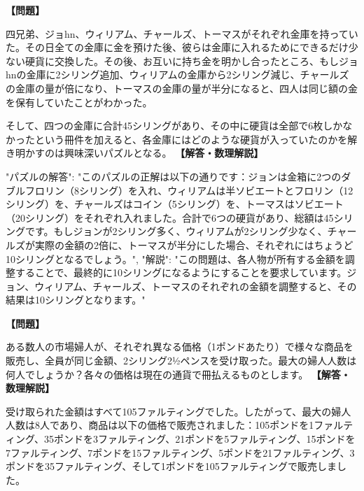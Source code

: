 \documentclass[10pt,a4paper,oneside,openany]{ltjsbook}
\begin{document}
\begin{tcolorbox}[colback=softblue,colframe=primaryblue,title=\textbf{第 17 問：THE PUZZLING MONEY-BOXES.},arc=2mm,boxrule=1pt,breakable]
\textbf{【問題】}\par\vspace{0.3em}
四兄弟、ジョhn、ウィリアム、チャールズ、トーマスがそれぞれ金庫を持っていた。その日全ての金庫に金を預けた後、彼らは金庫に入れるためにできるだけ少ない硬貨に交換した。その後、お互いに持ち金を明かし合ったところ、もしジョhnの金庫に2シリング追加、ウィリアムの金庫から2シリング減じ、チャールズの金庫の量が倍になり、トーマスの金庫の量が半分になると、四人は同じ額の金を保有していたことがわかった。

そして、四つの金庫に合計45シリングがあり、その中に硬貨は全部で6枚しかなかったという冊件を加えると、各金庫にはどのような硬貨が入っていたのかを解き明かすのは興味深いパズルとなる。
\tcblower
\textbf{【解答・数理解説】}\par\vspace{0.3em}
{
"パズルの解答": "このパズルの正解は以下の通りです：ジョンは金箱に2つのダブルフロリン（8シリング）を入れ、ウィリアムは半ソビエートとフロリン（12シリング）を、チャールズはコイン（5シリング）を、トーマスはソビエート（20シリング）をそれぞれ入れました。合計で6つの硬貨があり、総額は45シリングです。もしジョンが2シリング多く、ウィリアムが2シリング少なく、チャールズが実際の金額の2倍に、トーマスが半分にした場合、それぞれにはちょうど10シリングとなるでしょう。",
"解説": "この問題は、各人物が所有する金額を調整することで、最終的に10シリングになるようにすることを要求しています。ジョン、ウィリアム、チャールズ、トーマスのそれぞれの金額を調整すると、その結果は10シリングとなります。"
}
\end{tcolorbox}

\begin{tcolorbox}[colback=softblue,colframe=primaryblue,title=\textbf{第 18 問：市場婦人 （原題: THE MARKET WOMEN.）},arc=2mm,boxrule=1pt,breakable]
\textbf{【問題】}\par\vspace{0.3em}
ある数人の市場婦人が、それぞれ異なる価格（1ポンドあたり）で様々な商品を販売し、全員が同じ金額、2シリング2½ペンスを受け取った。最大の婦人人数は何人でしょうか？各々の価格は現在の通貨で冊払えるものとします。
\tcblower
\textbf{【解答・数理解説】}\par\vspace{0.3em}
受け取られた金額はすべて105ファルティングでした。したがって、最大の婦人人数は8人であり、商品は以下の価格で販売されました：105ポンドを1ファルティング、35ポンドを3ファルティング、21ポンドを5ファルティング、15ポンドを7ファルティング、7ポンドを15ファルティング、5ポンドを21ファルティング、3ポンドを35ファルティング、そして1ポンドを105ファルティングで販売しました。
\end{tcolorbox}
\end{document}
